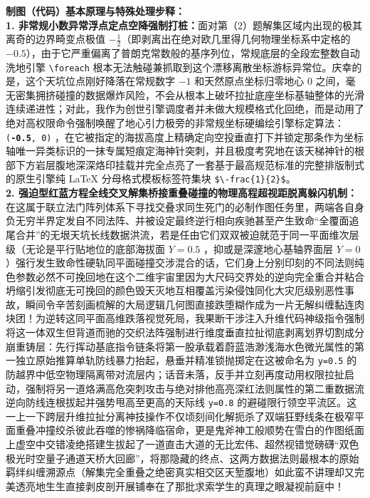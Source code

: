 \documentclass[12pt, a4paper]{ctexrep}
\begin{document}
{\small\color{blue!70!black}
\textbf{制图（代码）基本原理与特殊处理步释：}\\
\textbf{1. 非常规小数异常浮点定点空降强制打桩：}面对第（2）题解集区域内出现的极其离奇的边界畸变点极值 $-\frac{1}{2}$（即剥离出在绝对欧几里得几何物理坐标系中定格的 $-0.5$），由于它严重偏离了普朗克常数般的基序列位，常规底层的全段宏整数自动洗地引擎 \texttt{\textbackslash foreach} 根本无法触碰兼抓取到这个漂移离散坐标游标异常位。庆幸的是，这个天坑位点刚好降落在常规数字 $-1$ 和天然原点坐标归零地心 $0$ 之间，毫无密集拥挤碰撞的数据爆炸风险，不会从根本上破坏拉扯底座坐标基轴整体的光滑连续递进性；对此，我作为创世引擎调度者并未做大规模格式化回绝，而是动用了绝对高权限命令强制唤醒了地心引力极旁的非常规坐标硬编绘引擎标定算法：\texttt{(\textbf{-0.5}, 0)} ，在它被指定的海拔高度上精确定向空投垂直打下并锁定那条作为坐标轴唯一异类标识的一抹专属短痕定海神针突刺，并且极度考究地在该天梯神针的根部下方岩层腹地深深烙印挂载并完全点亮了一套基于最高规范标准的完整排版制式的原生引擎纯 LaTeX 分母格式模板标签符集块 \texttt{\$\textbackslash -frac\{1\}\{2\}\$}。\\
\textbf{2. 强迫型红蓝方程全线交叉解集桥接重叠碰撞的物理高程超视距脱离躲闪机制：}在这属于联立法门阵列体系下寻找交叠求同生死门的必制作图任务里，两端各自身负无穷半界定发自不同法阵、并被设定最终逆行相向疾驰甚至产生致命“全覆面追尾合并”的无垠天坑长线数据洪流，若是任由它们双双被迫就范于同一平面维次层级（无论是平行贴地位的底部海拔面 $Y=0.5$ ，抑或是深邃地心基轴界面层 $Y=0$ ）强行发生致命性硬轨同平面碰撞交涉混合的话，它们身上分别印刻的不同法则纯色参数必然不可挽回地在这个二维宇宙里因为大尺码交界处的逆向完全重合并粘合坍缩引发彻底无可挽回的颜色毁天灭地互相覆盖污染侵蚀同化大灾厄级别恶性事故，瞬间令辛苦刻画梳解的大局逻辑几何图直接跌堕糊作成为一片无解纠缠黏连肉块团！为逆转这同平面高维跌落视觉死局，我果断干涉注入升维代码神级指令强制将这一体双生但背道而驰的交织法阵强制进行维度垂直拉扯彻底剥离划界切割成分崩重铸层：先行挥动基底指令链条将第一股承载着蔚蓝浩渺浅海水色微光属性的第一独立原始推算单轨防线暴力抬起，悬垂并精准锁抛掷定在这被命名为 \texttt{y=0.5} 的防越界中低空物理隔离带对流层内；话音未落，反手并立刻再度动用权限拉扯启动，强制将另一道烙满高危突刺攻击与绝对排他高亮深红法则属性的第二重数据流逆向防线连根拔起并强势甩高至更高的天际线 \texttt{y=0.8} 的避碰限行领空平流区。这一上一下跨层升维拉扯分离神技操作不仅顷刻间化解扼杀了双端狂野线条在极窄平面重叠冲撞绞杀彼此吞噬的惨祸降临宿命，更是鬼斧神工般顺势在雪白的作图纸面上虚空中交错凌绝搭建生拔起了一道直击大道的无比宏伟、超然视错觉磅礴“双色极光时空量子通道天桥大回廊”，将那隐藏的终点、这两方数据法则最根本的原始羁绊纠缠溯源点（解集完全重叠之绝密真实相交区天堑腹地）如此蛮不讲理却又完美透亮地生生直接剥皮剖开展铺奉在了那批求索学生的真理之眼凝视前庭中！
}
\newpage
\end{document}
